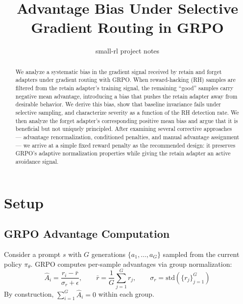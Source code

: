 \documentclass[11pt]{article}
\title{Advantage Bias Under Selective Gradient Routing in GRPO}
\author{small-rl project notes}
\date{}
\begin{document}
\maketitle

\begin{abstract}
We analyze a systematic bias in the gradient signal received by retain and forget
adapters under gradient routing with GRPO. When reward-hacking (RH) samples are
filtered from the retain adapter's training signal, the remaining ``good'' samples
carry negative mean advantage, introducing a bias that pushes the retain adapter
away from desirable behavior. We derive this bias, show that baseline invariance
fails under selective sampling, and characterize severity as a function of the RH
detection rate. We then analyze the forget adapter's corresponding positive mean
bias and argue that it is beneficial but not uniquely principled. After examining
several corrective approaches --- advantage renormalization, conditioned penalties,
and manual advantage assignment --- we arrive at a simple fixed reward penalty as
the recommended design: it preserves GRPO's adaptive normalization properties
while giving the retain adapter an active avoidance signal.
\end{abstract}

\section{Setup}

\subsection{GRPO Advantage Computation}

Consider a prompt $s$ with $G$ generations $\{a_1, \ldots, a_G\}$ sampled from
the current policy $\pi_\theta$. GRPO computes per-sample advantages via
group normalization:
\begin{equation}\label{eq:grpo-advantage}
    \hat{A}_i = \frac{r_i - \bar{r}}{\sigma_r + \epsilon},
    \qquad
    \bar{r} = \frac{1}{G}\sum_{j=1}^{G} r_j,
    \qquad
    \sigma_r = \mathrm{std}(\{r_j\}_{j=1}^{G})
\end{equation}
By construction, $\sum_{i=1}^{G} \hat{A}_i = 0$ within each group.
\end{document}
